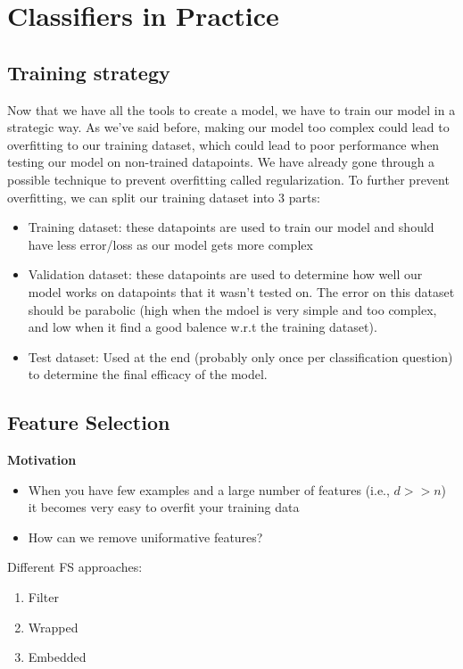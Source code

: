 \documentclass[12pt]{article}
\begin{document}
\section{Classifiers in Practice}

\subsection{Training strategy}

Now that we have all the tools to create a model, we have to train our model in a strategic way. As we've said before, making our model too complex could lead to overfitting to our training dataset, which could lead to poor performance when testing our model on non-trained datapoints. We have already gone through a possible technique to prevent overfitting called regularization. To further prevent overfitting, we can split our training dataset into 3 parts:

\begin{itemize}
	\item Training dataset: these datapoints are used to train our model and should have less error/loss as our model gets more complex
	\item Validation dataset: these datapoints are used to determine how well our model works on datapoints that it wasn't tested on. The error on this dataset should be parabolic (high when the mdoel is very simple and too complex, and low when it find a good balence w.r.t the training dataset).
	\item Test dataset: Used at the end (probably only once per classification question) to determine the final efficacy of the model.
\end{itemize}

\subsection{Feature Selection}

\textbf{Motivation}

\begin{itemize}
	\item When you have few examples and a large number of features (i.e., $d >> n$) it becomes very easy to overfit your training data
	\item How can we remove uniformative features?
\end{itemize}

Different FS approaches:
\begin{enumerate}
	\item Filter
	\item Wrapped
	\item Embedded
\end{enumerate}
\end{document}
